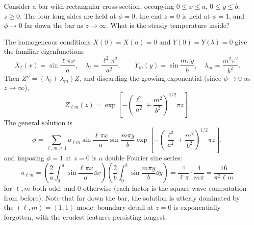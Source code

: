 \documentclass[a4paper]{scrartcl}
\begin{document}
\begin{example}
    Consider a bar with rectangular cross-section, occupying $0 \leq x \leq a$, $0 \leq y \leq b$, $z \geq 0$. The four long sides are held at $\phi = 0$, the end $z = 0$ is held at $\phi = 1$, and $\phi \rightarrow 0$ far down the bar as $z \rightarrow \infty$. What is the steady temperature inside?

    \begin{center}
    \end{center}

    The homogeneous conditions $X(0) = X(a) = 0$ and $Y(0) = Y(b) = 0$ give the familiar eigenfunctions
    $$
    X_\ell(x) = \sin \frac{\ell \pi x}{a}, \quad \lambda_\ell = \frac{\ell^2 \pi^2}{a^2}, \qquad Y_m(y) = \sin \frac{m \pi y}{b}, \quad \lambda_m = \frac{m^2 \pi^2}{b^2}.
    $$
    Then $Z'' = (\lambda_\ell + \lambda_m) Z$, and discarding the growing exponential (since $\phi \to 0$ as $z \to \infty$),
    $$
    Z_{\ell m}(z) = \exp\left[-\left(\frac{\ell^2}{a^2} + \frac{m^2}{b^2}\right)^{1/2} \pi z\right].
    $$
    The general solution is
    $$
    \phi = \sum_{\ell, m \geq 1} a_{\ell m} \sin \frac{\ell \pi x}{a} \sin \frac{m \pi y}{b} \exp\left[-\left(\frac{\ell^2}{a^2} + \frac{m^2}{b^2}\right)^{1/2} \pi z \right],
    $$
    and imposing $\phi = 1$ at $z = 0$ is a double Fourier sine series:
    $$
    a_{\ell m} = \left(\frac{2}{a}\int_0^a \sin \frac{\ell \pi x}{a} \dd x \right)\left(\frac{2}{b} \int_0^b \sin \frac{m \pi y}{b} \dd y\right) = \frac{4}{\ell \pi}\cdot \frac{4}{m \pi} = \frac{16}{\pi^2 \ell m}
    $$
    for $\ell, m$ both odd, and $0$ otherwise (each factor is the square wave computation from before).
    Note that far down the bar, the solution is utterly dominated by the $(\ell, m) = (1,1)$ mode: boundary detail at $z = 0$ is exponentially forgotten, with the crudest features persisting longest.
\end{example}
\end{document}
